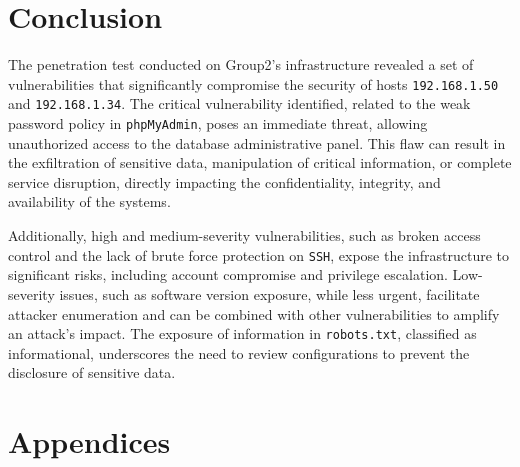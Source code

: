 \documentclass[a4paper,12pt]{article}
\begin{document}
\section{Conclusion}

The penetration test conducted on Group2’s infrastructure revealed a set of vulnerabilities that significantly compromise the security of hosts \texttt{192.168.1.50} and \texttt{192.168.1.34}. The critical vulnerability identified, related to the weak password policy in \texttt{phpMyAdmin}, poses an immediate threat, allowing unauthorized access to the database administrative panel. This flaw can result in the exfiltration of sensitive data, manipulation of critical information, or complete service disruption, directly impacting the confidentiality, integrity, and availability of the systems.

Additionally, high and medium-severity vulnerabilities, such as broken access control and the lack of brute force protection on \texttt{SSH}, expose the infrastructure to significant risks, including account compromise and privilege escalation. Low-severity issues, such as software version exposure, while less urgent, facilitate attacker enumeration and can be combined with other vulnerabilities to amplify an attack’s impact. The exposure of information in \texttt{robots.txt}, classified as informational, underscores the need to review configurations to prevent the disclosure of sensitive data.

\section{Appendices}
\end{document}
